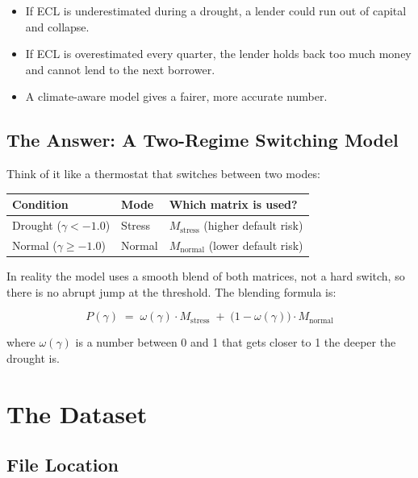 \documentclass[12pt,a4paper]{article}
\begin{document}
\begin{itemize}[leftmargin=1.5em]
  \item If ECL is underestimated during a drought, a lender could run out of
        capital and collapse.
  \item If ECL is overestimated every quarter, the lender holds back too much
        money and cannot lend to the next borrower.
  \item A climate-aware model gives a fairer, more accurate number.
\end{itemize}

\subsection{The Answer: A Two-Regime Switching Model}

Think of it like a thermostat that switches between two modes:

\begin{center}
\begin{tabular}{lll}
  \toprule
  Condition & Mode & Which matrix is used? \\
  \midrule
  Drought (\(\gamma < -1.0\))  & Stress & \(M_{\text{stress}}\) (higher default risk) \\
  Normal (\(\gamma \geq -1.0\)) & Normal & \(M_{\text{normal}}\) (lower default risk) \\
  \bottomrule
\end{tabular}
\end{center}

In reality the model uses a smooth blend of both matrices, not a hard switch,
so there is no abrupt jump at the threshold.  The blending formula is:

\[
  P(\gamma) \;=\; \omega(\gamma)\cdot M_{\text{stress}}
              \;+\; \bigl(1-\omega(\gamma)\bigr)\cdot M_{\text{normal}}
\]

where \(\omega(\gamma)\) is a number between 0 and 1 that gets closer to 1
the deeper the drought is.

\newpage
\section{The Dataset}

\subsection{File Location}
\end{document}

